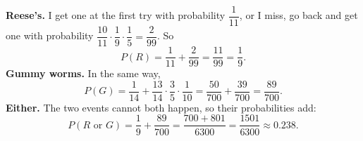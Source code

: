 \textbf{Reese's.} I get one at the first try with probability $\dfrac1{11}$, or I miss, go back and get one with probability $\dfrac{10}{11}\cdot\dfrac19\cdot\dfrac15=\dfrac{2}{99}$. So
\[P(R)=\dfrac1{11}+\dfrac2{99}=\dfrac{11}{99}=\dfrac19.\]
\textbf{Gummy worms.} In the same way,
\[P(G)=\dfrac1{14}+\dfrac{13}{14}\cdot\dfrac35\cdot\dfrac1{10}=\dfrac{50}{700}+\dfrac{39}{700}=\dfrac{89}{700}.\]
\textbf{Either.} The two events cannot both happen, so their probabilities add:
\[P(R\text{ or }G)=\dfrac19+\dfrac{89}{700}=\dfrac{700+801}{6300}=\boxed{\dfrac{1501}{6300}}\approx0.238.\]
